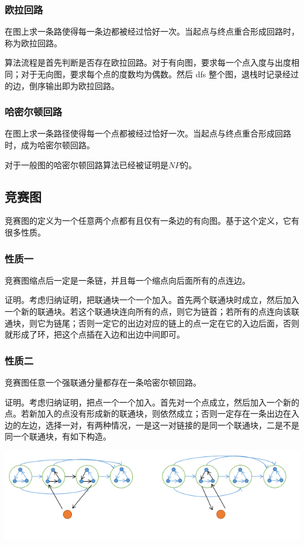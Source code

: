 \documentclass[UTF-8]{ctexart}
\begin{document}
	\subsubsection{欧拉回路}
	在图上求一条路使得每一条边都被经过恰好一次。当起点与终点重合形成回路时，称为欧拉回路。
	
	算法流程是首先判断是否存在欧拉回路。对于有向图，要求每一个点入度与出度相同；对于无向图，要求每个点的度数均为偶数。然后 dfs 整个图，退栈时记录经过的边，倒序输出即为欧拉回路。
	\subsubsection{哈密尔顿回路}
	在图上求一条路径使得每一个点都被经过恰好一次。当起点与终点重合形成回路时，成为哈密尔顿回路。
	
	对于一般图的哈密尔顿回路算法已经被证明是$NP$的。
	\subsection{竞赛图}
	竞赛图的定义为一个任意两个点都有且仅有一条边的有向图。基于这个定义，它有很多性质。
	
	\subsubsection{性质一}
	竞赛图缩点后一定是一条链，并且每一个缩点向后面所有的点连边。
	
	证明。考虑归纳证明，把联通块一个一个加入。首先两个联通块时成立，然后加入一个新的联通块。若这个联通块连向所有的点，则它为链首；若所有的点连向该联通块，则它为链尾；否则一定它的出边对应的链上的点一定在它的入边后面，否则就形成了环，把这个点插在入边和出边中间即可。
	
	\subsubsection{性质二}
	竞赛图任意一个强联通分量都存在一条哈密尔顿回路。
	
	证明。考虑归纳证明，把点一个一个加入。首先对一个点成立，然后加入一个新的点。若新加入的点没有形成新的联通块，则依然成立；否则一定存在一条出边在入边的左边，选择一对，有两种情况，一是这一对链接的是同一个联通块，二是不是同一个联通块，有如下构造。
	
	\begin{center}
		\includegraphics[width=15cm]{file//hamiltonian1.png}
	\end{center}
\end{document}
